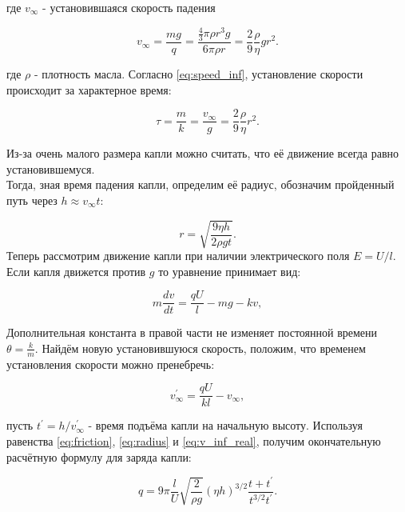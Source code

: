 \documentclass{lab}
\begin{document}
где $v_{\infty}$ - установившаяся скорость падения

\begin{equation}
	v_{\infty} = \frac{mg}{q}=\frac{\frac{4}{3} \pi \rho r^{3} g}{6 \pi \rho r}=\frac{2}{9}\frac{\rho}{\eta}g r^{2}.
	\label{eq:speed_inf_calculated}
\end{equation}

где $\rho$ - плотность масла. Согласно \eqref{eq:speed_inf}, установление скорости происходит за характерное время:

\begin{equation}
	\tau = \frac{m}{k}=\frac{v_{\infty}}{g} = \frac{2}{9}\frac{\rho}{\eta} r^{2}.
	\label{eq:tau}
\end{equation}

Из-за очень малого размера капли можно считать, что её движение всегда равно \\ установившемуся.
\\
Тогда, зная время падения капли, определим её радиус, обозначим пройденный путь через $h \approx v_{\infty}t$:

\begin{equation}
	r = \sqrt{\frac{9 \eta h}{2 \rho gt} }.
	\label{eq:radius}
\end{equation}
\newpage
Теперь рассмотрим движение капли при наличии электрического поля $E=U/l$. Если капля движется против $g$ то уравнение принимает вид:

\begin{equation}
	m\frac{dv}{dt} = \frac{qU}{l} - mg - kv,
\end{equation}

Дополнительная константа в правой части не изменяет постоянной времени $\theta = \frac{k}{m}$. Найдём новую установившуюся скорость, положим, что временем установления скорости можно пренебречь:

\begin{equation}
	v_{\infty}^{'} = \frac{qU}{kl} - v_{\infty},
	\label{eq:v_inf_real}
\end{equation}

пусть $t^{'} = h/v^{'}_{\infty}$ - время подъёма капли на начальную высоту. Используя равенства \eqref{eq:friction}, \eqref{eq:radius} и \eqref{eq:v_inf_real}, получим окончательную расчётную формулу для заряда капли:

\begin{equation}
	q = 9\pi \frac{l}{U} \sqrt{\frac{2}{\rho g}} (\eta h)^{3/2} \frac{t + t^{'}}{t^{3/2} t^{'}}.
	\label{eq:q_final}
\end{equation}
\end{document}
